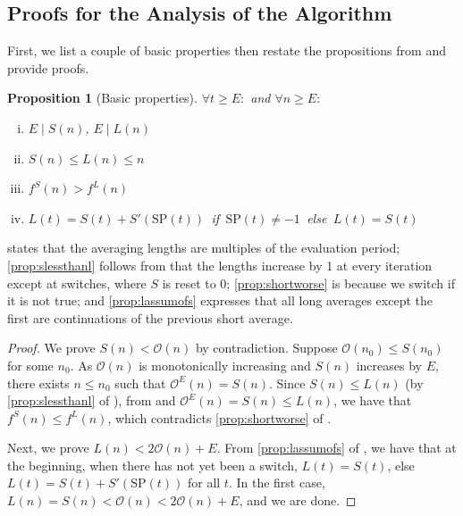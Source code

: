 \documentclass[twocolumn]{article}
\newcommand*{\SP}{\mathrm{SP}}
\newtheorem{proposition}[theorem]{Proposition}
\newcommand{\divides}{\mathrel{|}}
\newcommand{\OL}{\mathcal{O}}
\begin{document}
\begin{appendices}


\section{Proofs for the Analysis of the Algorithm}
\label{sec:proofs-for-analysis}

First, we list a couple of basic properties then restate the propositions from  and provide proofs.

\begin{proposition}[Basic properties]
\label{prop:basics}
$\forall t \geq E\colon$ and $\forall n \geq E \colon$
\begin{enumerate}[(i)]
\item $E \divides S(n)$, $E \divides L(n)$\label{prop:multiples}
\item $S(n) \leq L(n) \leq n$\label{prop:slessthanl}
\item $f^S(n) > f^L(n)$\label{prop:shortworse}
\item $L(t) = S(t) + S'\!(\SP(t))$ \,if\, $\SP(t) \neq -1$ \,else\, $L(t) = S(t)$\label{prop:lassumofs}
\end{enumerate}
\end{proposition}

 states that the averaging lengths are multiples of the evaluation period; \ref{prop:slessthanl} follows from that the lengths increase by 1 at every iteration except at switches, where $S$ is reset to $0$; \ref{prop:shortworse} is because we switch if it is not true; and \ref{prop:lassumofs} expresses that all long averages except the first are continuations of the previous short average.

\propbounds*

\begin{proof}
We prove $S(n) < \OL(n)$ by contradiction.
Suppose $\OL(n_0) \leq S(n_0)$ for some $n_0$.
As $\OL(n)$ is monotonically increasing and $S(n)$ increases by $E$, there exists $n\leq n_0$ such that $\OL^E(n)=S(n)$.
Since $S(n) \leq L(n)$ (by \ref{prop:slessthanl} of ), from  and $\OL^E(n)=S(n) \leq L(n)$, we have that $f^S(n) \leq f^L(n)$, which contradicts \ref{prop:shortworse} of .

Next, we prove $L(n) < 2\OL(n)+E$.
From \ref{prop:lassumofs} of , we have that at the beginning, when there has not yet been a switch, $L(t) = S(t)$, else $L(t) = S(t) + S'\!(\SP(t))$ for all $t$.
In the first case, $L(n) = S(n) < \OL(n) < 2\OL(n)+E$, and we are done.


\end{proof}
\end{appendices}
\end{document}
